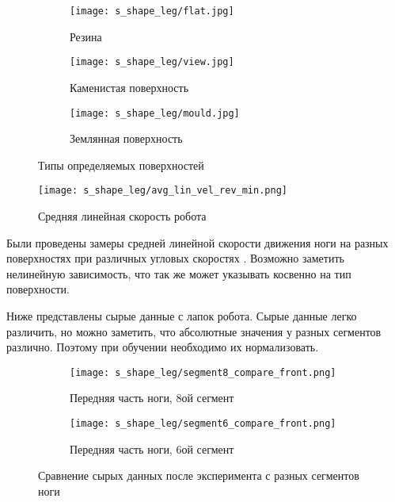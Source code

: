 \begin{figure}[H]
    \begin{subfigure}[t]{0.24\textwidth}
        \centering\texttt{[image: s\_shape\_leg/flat.jpg]}
        \caption{Резина}
        \label{fig:s_shape_leg/flat.jpg}
    \end{subfigure}
    \hfill
    \begin{subfigure}[t]{0.32\textwidth}
        \centering\texttt{[image: s\_shape\_leg/view.jpg]}
        \caption{Каменистая поверхность}
        \label{fig:s_shape_leg/view.jpg}
    \end{subfigure}
    \begin{subfigure}[t]{0.42\textwidth}
        \centering\texttt{[image: s\_shape\_leg/mould.jpg]}
        \caption{Землянная поверхность}
        \label{fig:s_shape_leg/mould.jpg}
    \end{subfigure}
    \caption{Типы определяемых поверхностей}
\end{figure}

\begin{figure}[H]
    \centering\texttt{[image: s\_shape\_leg/avg\_lin\_vel\_rev\_min.png]}
    \caption{Средняя линейная скорость робота}
    \label{fig:s_shape_leg/avg_lin_vel_rev_min.png}
\end{figure}

Были проведены замеры средней линейной скорости движения ноги на разных поверхностях при различных угловых скоростях . Возможно заметить нелинейную зависимость, что так же может указывать косвенно на тип поверхности.

Ниже  представлены сырые данные с лапок робота. Сырые данные легко различить, но можно заметить, что абсолютные значения у разных сегментов различно. Поэтому при обучении необходимо их нормализовать.


\begin{figure}[H]
    \begin{subfigure}[t]{0.9\textwidth}
        \centering\texttt{[image: s\_shape\_leg/segment8\_compare\_front.png]}
        \caption{Передняя часть ноги, 8ой сегмент}
    \end{subfigure}

    \begin{subfigure}[t]{0.9\textwidth}
        \centering\texttt{[image: s\_shape\_leg/segment6\_compare\_front.png]}
        \caption{Передняя часть ноги, 6ой сегмент}
    \end{subfigure}
    \caption{Сравнение сырых данных после эксперимента с разных сегментов ноги}
    \label{fig:data_from_legs}
\end{figure}



